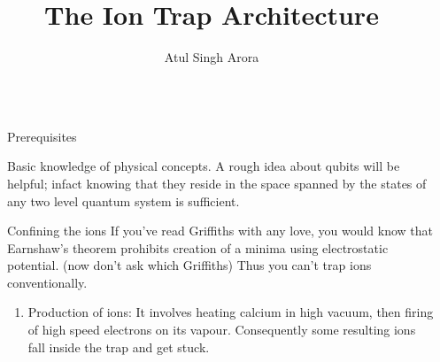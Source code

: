 \documentclass[final,hyperref={pdfpagelabels=false}]{beamer}
\title{\huge The Ion Trap Architecture} %
\author{Atul Singh Arora} %
\institute{Indian Institute of Science, Education and Research, Mohali} %
\begin{document}

\begin{frame}[t] %

\begin{columns}[t] %

\begin{column}{.02\textwidth}\end{column} %

\begin{column}{.465\textwidth} %


\begin{block}{Prerequisites}

	Basic knowledge of physical concepts. A rough idea about qubits will be helpful; infact knowing that they reside in the space spanned by the states of any two level quantum system is sufficient.

\end{block}

            
\begin{block}{Confining the ions}
	If you've read Griffiths with any love, you would know that Earnshaw's
	theorem prohibits creation of a minima using electrostatic potential.
	(now don't ask which Griffiths) Thus you can't trap ions conventionally.

	\begin{enumerate}
		\item Production of ions: It involves heating calcium in high vacuum, then firing of high speed electrons on its vapour. Consequently some resulting ions fall inside the trap and get stuck.


\end{enumerate}
\end{block}
\end{column}
\end{columns}
\end{frame}
\end{document}
